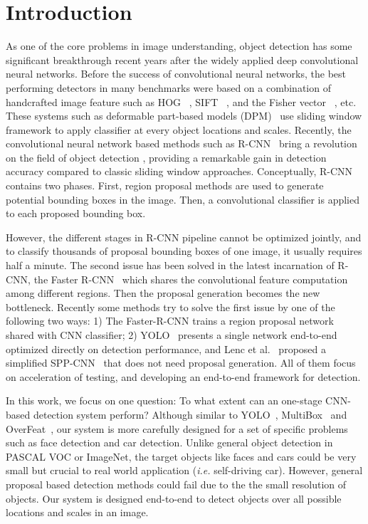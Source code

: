 \section{Introduction}

As one of the core problems in image understanding, object detection has some significant breakthrough recent years after the widely applied deep convolutional neural networks. Before the success of convolutional neural networks, the best performing detectors in many benchmarks were based on a combination of handcrafted image feature such as HOG~\cite{dalal2005histograms} , SIFT~\cite{lowe2004distinctive} , and the Fisher vector~\cite{cinbis2013segmentation} , etc. These systems such as deformable part-based models (DPM)~\cite{felzenszwalb2010object} use sliding window framework to apply classifier at every object locations and scales. Recently, the convolutional neural network based methods such as R-CNN~\cite{girshick2014rich,girshick2015fast} bring a revolution on the field of object detection , providing a remarkable gain in detection accuracy compared to classic sliding window approaches. Conceptually, R-CNN contains two phases. First, region proposal methods are used to generate potential bounding boxes in the image. Then, a convolutional classifier is applied to each proposed bounding box. 

However, the different stages in R-CNN pipeline cannot be optimized jointly, and to classify thousands of proposal bounding boxes of one image, it usually requires half a minute. The second issue has been solved in the latest incarnation of R-CNN, the Faster R-CNN~\cite{ren2015faster} which shares the convolutional feature computation among different regions. Then the proposal generation becomes the new bottleneck. Recently some methods try to solve the first issue by one of the following two ways: 1) The Faster-R-CNN trains a region proposal network shared with CNN classifier; 2) YOLO~\cite{YOLO}  presents a single network end-to-end optimized directly on detection performance, and Lenc et al.~\cite{LencV15} proposed a simplified SPP-CNN~\cite{} that does not need proposal generation. All of them focus on acceleration of testing, and developing an end-to-end framework for detection. 

In this work, we focus on one question: To what extent can an one-stage CNN-based detection system perform? Although similar to YOLO~\cite{YOLO}, MultiBox~\cite{} and OverFeat~\cite{sermanet2013overfeat}, our system is more carefully designed for a set of specific problems such as face detection and car detection. Unlike general object detection in PASCAL VOC or ImageNet, the target objects like faces and cars could be very small but crucial to real world application ({\em i.e.} self-driving car). However, general proposal based detection methods could fail due to the the small resolution of objects. Our system is designed end-to-end to detect objects over all possible locations and scales in an image. 

